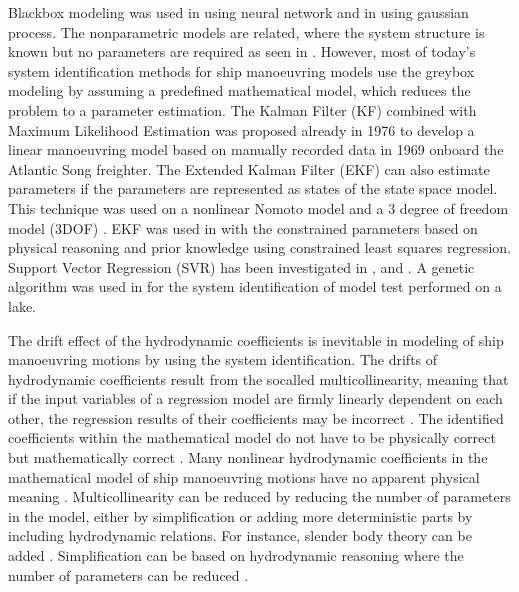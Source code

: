 \documentclass[review]{elsarticle}
\begin{document}
\sphinxAtStartPar
Black\sphinxhyphen{}box modeling was used in \cite{he_nonparametric_2022} using neural network and in \cite{xue_identification_2021} using gaussian process. The nonparametric models are related, where the system structure is known but no parameters are required as seen in \cite{pongduang_nonparametric_2020}. However, most of today’s system identification methods for ship manoeuvring models use the grey\sphinxhyphen{}box modeling by assuming a predefined mathematical model, which reduces the problem to a parameter estimation.
The Kalman Filter (KF) combined with Maximum Likelihood Estimation was proposed already in 1976 \cite{astrom_identification_1976} to develop a linear manoeuvring model based on manually recorded data in 1969 onboard the Atlantic Song freighter. The Extended Kalman Filter (EKF) can also estimate parameters if the parameters are represented as states of the state space model. This technique was used on a nonlinear Nomoto model \cite{perera_system_2015} and a 3 degree of freedom model (3DOF) \cite{shi_identification_2009}. EKF was used in \cite{araki_estimating_2012} with the constrained parameters based on physical reasoning and prior knowledge using constrained least squares regression.
Support Vector Regression (SVR) has been investigated in \cite{zhu_parameter_2017}, \cite{wang_parameter_2021} and \cite{luo_parameter_2016}. A genetic algorithm was used in \cite{miller_ship_2021} for the system identification of model test performed on a lake.

\sphinxAtStartPar
The drift effect of the hydrodynamic coefficients is inevitable in modeling of ship manoeuvring motions by using the system identification. The drifts of hydrodynamic coefficients result from the so\sphinxhyphen{}called multicollinearity, meaning that if the input variables of a regression model are firmly linearly dependent on each other, the regression results of their coefficients may be incorrect \cite{luo_parameter_2016}. The identified coefficients within the mathematical model do not have to be physically correct but mathematically correct \cite{ittc_maneuvering_2008}. Many nonlinear hydrodynamic coefficients in the mathematical model of ship manoeuvring motions have no apparent physical meaning \cite{luo_parameter_2016}. Multicollinearity can be reduced by reducing the number of parameters in the model, either by simplification or adding more deterministic parts by including hydrodynamic relations. For instance, slender body theory can be added \cite{hwang_cancellation_1982}. Simplification can be based on hydrodynamic reasoning where the number of parameters can be reduced \cite{luo_parameter_2016}.
\end{document}
